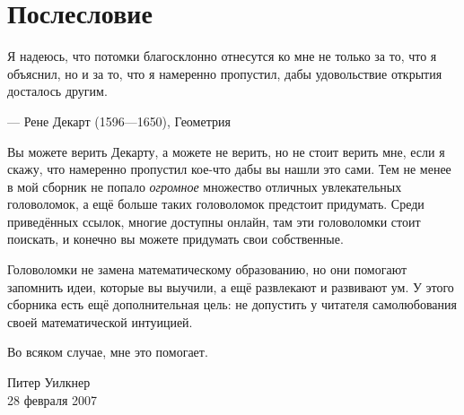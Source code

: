 \chapter{Послесловие}


\setlength{\epigraphwidth}{.83\textwidth}
\epigraph{Я надеюсь, что потомки благосклонно отнесутся ко мне не только за то, что я объяснил, но и за то, что я намеренно пропустил, дабы удовольствие открытия досталось другим.}{--- Рене Декарт (1596---1650), Геометрия}


Вы можете верить Декарту, а можете не верить, но не стоит верить мне, если я скажу, что намеренно пропустил кое-что дабы вы нашли это сами.
Тем не менее в мой сборник не попало \emph{огромное} множество отличных увлекательных головоломок, а ещё больше таких головоломок предстоит придумать.
Среди приведённых ссылок, многие доступны онлайн, там эти головоломки стоит поискать,
и конечно вы можете придумать свои собственные.

Головоломки не замена математическому образованию, но они помогают запомнить идеи, которые вы выучили, а ещё развлекают и развивают ум.
У этого сборника есть ещё дополнительная цель:
не допустить у читателя самолюбования своей математической интуицией.

Во всяком случае, мне это помогает.

\begin{flushright}
Питер Уилкнер\\
28 февраля 2007
\end{flushright}
